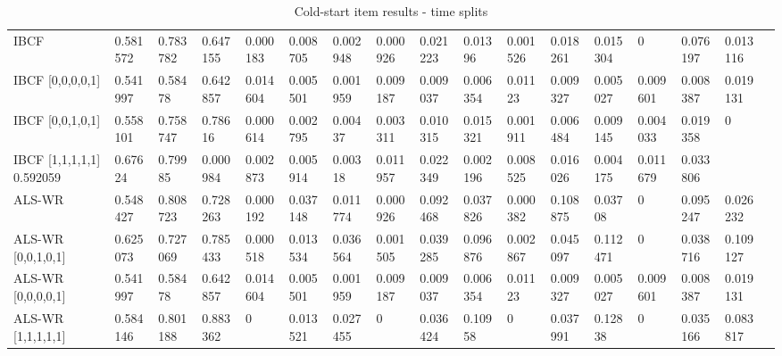 \begin{table}[H]
{\begin{tabular}{*{17}{l}}
\rowcolor{Gray}
IBCF &	0.581572	&	0.783782	&	0.647155	&	0.000183	&	0.008705	&	0.002948	&	0.000926	&	0.021223	&	0.01396	&	0.001526	&	0.018261	&	0.015304	&	0	&	0.076197	&	0.013116	&	\\
IBCF [0,0,0,0,1] &	0.541997	&	0.58478	&	0.642857	&	0.014604	&	0.005501	&	0.001959	&	0.009187	&	0.009037	&	0.006354	&	0.01123	&	0.009327	&	0.005027	&	0.009601	&	0.008387	&	0.019131	& \\																																									
IBCF [0,0,1,0,1] &	0.558101	&	0.758747	&	0.78616	&	0.000614	&	0.002795	&	0.00437	&	0.003311	&	0.010315	&	0.015321	&	0.001911	&	0.006484	&	0.009145	&	0.004033	&	0.019358	&	0	& \\
IBCF [1,1,1,1,1]	0.592059	&	0.67624	&	0.79985	&	0.000984	&	0.002873	&	0.005914	&	0.00318	&	0.011957	&	0.022349	&	0.002196	&	0.008525	&	0.016026	&	0.004175	&	0.011679	&	0.033806	& \\
\rowcolor{Gray}
ALS-WR & 	0.548427	&	0.808723	&	0.728263	&	0.000192	&	0.037148	&	0.011774	&	0.000926	&	0.092468	&	0.037826	&	0.000382	&	0.108875	&	0.03708	&	0	&	0.095247	&	0.026232	&	\\
ALS-WR [0,0,1,0,1] &  0.625073	&	0.727069	&	0.785433	&	0.000518	&	0.013534	&	0.036564	&	0.001505	&	0.039285	&	0.096876	&	0.002867	&	0.045097	&	0.112471	&	0	&	0.038716	&	0.109127	& \\
ALS-WR [0,0,0,0,1]&	0.541997	&	0.58478	&	0.642857	&	0.014604	&	0.005501	&	0.001959	&	0.009187	&	0.009037	&	0.006354	&	0.01123	&	0.009327	&	0.005027	&	0.009601	&	0.008387	&	0.019131	& \\																														
ALS-WR [1,1,1,1,1] &	0.584146	&	0.801188	&	0.883362	&	0	&	0.013521	&	0.027455	&	0	&	0.036424	&	0.10958	&	0	&	0.037991	&	0.12838	&	0	&	0.035166	&	0.083817	& \\																														



\bottomrule
\end{tabular}
}
\caption{Cold-start item results - time splits}
\end{table}


